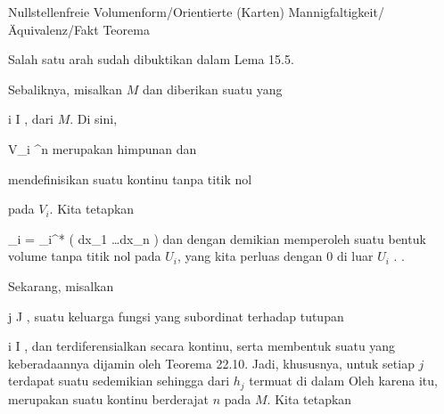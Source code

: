{Nullstellenfreie Volumenform/Orientierte (Karten) Mannigfaltigkeit/Äquivalenz/Fakt}
{Teorema}
{}
{

\faktzusatz {}

}
{

\teilbeweis {}{}{}
{Salah satu arah sudah dibuktikan
dalam Lema 15.5.}
{}
\teilbeweis {}{}{}
{Sebaliknya, misalkan $M$
dan diberikan suatu
yang

 {}
 {i \in I} {}
 {} {} {} {,}
dari $M$. Di sini,

\mavergleichskette
{\vergleichskette
{ V_i
}
{ \subseteq }{ \R^n
}
{  }{
}
{    }{
}
{   }{
}
}
{}{}{}
merupakan himpunan
dan

 mendefinisikan suatu
kontinu tanpa titik nol
 {} {}

 pada $V_i$. Kita tetapkan

\mavergleichskettedisp
{\vergleichskette
{ \omega_i
}
{ =} { \alpha_i^* \left( dx_1 \wedge \ldots \wedge dx_n \right)
}
{ } {
}
{ } {
}
{ } {
}
}
{}{}{}
dan dengan demikian memperoleh suatu bentuk volume tanpa titik nol pada $U_i$, yang kita perluas dengan $0$ di luar $U_i$ {.} {.}

Sekarang, misalkan

 {}
 {j \in J} {}
 {} {} {} {,}
suatu keluarga fungsi yang subordinat terhadap tutupan

 {}
 {i \in I} {}
 {} {} {} {,}
dan terdiferensialkan secara kontinu, serta membentuk suatu
yang keberadaannya dijamin oleh
Teorema 22.10.
Jadi, khususnya, untuk setiap $j$ terdapat suatu
 sedemikian sehingga
dari $h_j$ termuat di dalam
Oleh karena itu,
 merupakan suatu
kontinu berderajat $n$ pada $M$. Kita tetapkan

}}
